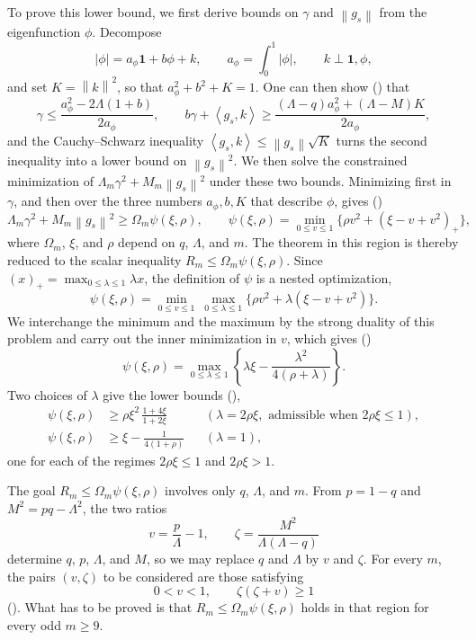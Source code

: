 \documentclass[11pt]{article}
\numberwithin{equation}{section}
\newcommand{\one}{\mathbf 1}
\newcommand{\ip}[2]{\left\langle #1,#2\right\rangle}
\newcommand{\norm}[1]{\left\lVert #1\right\rVert}
\newcommand{\pos}[1]{\left(#1\right)_{+}}
\begin{document}
\begin{enumerate}[label=\textbf{Section \arabic*.},leftmargin=4.6em,start=2]
  To prove this lower bound, we first derive bounds on $\gamma$ and
  $\norm{g_s}$ from the eigenfunction $\phi$.  Decompose
  \[
    |\phi|=a_\phi\one+b\phi+k,
    \qquad a_\phi=\int_0^1|\phi|,
    \qquad k\perp\one,\phi,
  \]
  and set $K=\norm k^2$, so that $a_\phi^2+b^2+K=1$.  One can then show
  () that
  \[
    \gamma\le\frac{a_\phi^2-2\Lambda(1+b)}{2a_\phi},
    \qquad
    b\gamma+\ip{g_s}k\ge
    \frac{(\Lambda-q)a_\phi^2+(\Lambda-M)K}{2a_\phi},
  \]
  and the Cauchy--Schwarz inequality $\ip{g_s}k\le\norm{g_s}\sqrt K$ turns
  the second inequality into a lower bound on $\norm{g_s}^2$.  We then solve the constrained minimization of
  $\Lambda_m\gamma^2+M_m\norm{g_s}^2$ under these two bounds.  Minimizing first
  in $\gamma$, and then over the three numbers $a_\phi,b,K$ that describe
  $\phi$, gives ()
  \[
    \Lambda_m\gamma^2+M_m\norm{g_s}^2\ge \Omega_m\psi(\xi,\rho),
    \qquad
    \psi(\xi,\rho)=\min_{0\le v\le1}
    \bigl\{\rho v^2+\pos{\xi-v+v^2}\bigr\},
  \]
  where $\Omega_m$, $\xi$, and $\rho$ depend on $q$, $\Lambda$,
  and $m$.  The theorem in this region is thereby reduced to the scalar
  inequality $R_m\le \Omega_m\psi(\xi,\rho)$.  Since
  $\pos x=\max_{0\le\lambda\le1}\lambda x$, the definition of $\psi$ is a
  nested optimization,
  \[
    \psi(\xi,\rho)=\min_{0\le v\le1}\ \max_{0\le\lambda\le1}
    \bigl\{\rho v^2+\lambda(\xi-v+v^2)\bigr\}.
  \]
  We interchange the minimum and the maximum by the strong duality of this
  problem and carry out the inner minimization in $v$, which gives
  ()
  \[
    \psi(\xi,\rho)=\max_{0\le\lambda\le1}
    \left\{\lambda\xi-\frac{\lambda^2}{4(\rho+\lambda)}\right\}.
  \]
  Two choices of $\lambda$ give the lower bounds
  (),
  \begin{align*}
    \psi(\xi,\rho)&\ge\rho\xi^2\,\frac{1+4\xi}{1+2\xi}
    &&(\lambda=2\rho\xi,\text{ admissible when }2\rho\xi\le1),\\
    \psi(\xi,\rho)&\ge\xi-\frac{1}{4(1+\rho)}
    &&(\lambda=1),
  \end{align*}
  one for each of the regimes $2\rho\xi\le1$ and $2\rho\xi>1$.

  The goal $R_m\le \Omega_m\psi(\xi,\rho)$ involves only $q$, $\Lambda$, and $m$.
  From $p=1-q$ and $M^2=pq-\Lambda^2$, the two ratios
  \[
    v=\frac {p}{\Lambda}-1,
    \qquad
    \zeta=\frac{M^2}{\Lambda(\Lambda-q)}
  \]
  determine $q$, $p$, $\Lambda$, and $M$, so we may replace $q$ and $\Lambda$
  by $v$ and $\zeta$.  For every $m$, the pairs $(v,\zeta)$ to be considered
  are those satisfying
  \[
    0<v<1,
    \qquad
    \zeta(\zeta+v)\ge1
  \]
  ().  What has to be proved is that
  $R_m\le \Omega_m\psi(\xi,\rho)$ holds in that region for every odd $m\ge9$.


\end{enumerate}
\end{document}
